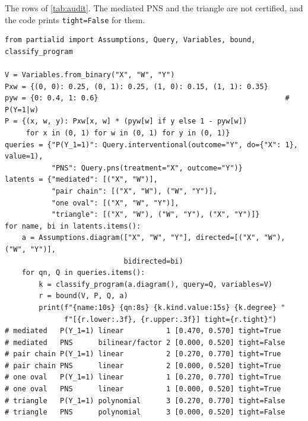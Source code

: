 The rows of \cref{tab:audit}. The mediated PNS and the triangle are not
certified, and the code prints \texttt{tight=False} for them.
\begin{lstlisting}
from partialid import Assumptions, Query, Variables, bound, classify_program

V = Variables.from_binary("X", "W", "Y")
Pxw = {(0, 0): 0.25, (0, 1): 0.25, (1, 0): 0.15, (1, 1): 0.35}
pyw = {0: 0.4, 1: 0.6}                                            # P(Y=1|w)
P = {(x, w, y): Pxw[x, w] * (pyw[w] if y else 1 - pyw[w])
     for x in (0, 1) for w in (0, 1) for y in (0, 1)}
queries = {"P(Y_1=1)": Query.interventional(outcome="Y", do={"X": 1}, value=1),
           "PNS": Query.pns(treatment="X", outcome="Y")}
latents = {"mediated": [("X", "W")],
           "pair chain": [("X", "W"), ("W", "Y")],
           "one oval": [("X", "W", "Y")],
           "triangle": [("X", "W"), ("W", "Y"), ("X", "Y")]}
for name, bi in latents.items():
    a = Assumptions.diagram(["X", "W", "Y"], directed=[("X", "W"), ("W", "Y")],
                            bidirected=bi)
    for qn, Q in queries.items():
        k = classify_program(a.diagram(), query=Q, variables=V)
        r = bound(V, P, Q, a)
        print(f"{name:10s} {qn:8s} {k.kind.value:15s} {k.degree} "
              f"[{r.lower:.3f}, {r.upper:.3f}] tight={r.tight}")
# mediated   P(Y_1=1) linear          1 [0.470, 0.570] tight=True
# mediated   PNS      bilinear/factor 2 [0.000, 0.520] tight=False
# pair chain P(Y_1=1) linear          2 [0.270, 0.770] tight=True
# pair chain PNS      linear          2 [0.000, 0.520] tight=True
# one oval   P(Y_1=1) linear          1 [0.270, 0.770] tight=True
# one oval   PNS      linear          1 [0.000, 0.520] tight=True
# triangle   P(Y_1=1) polynomial      3 [0.270, 0.770] tight=False
# triangle   PNS      polynomial      3 [0.000, 0.520] tight=False
\end{lstlisting}

\clearpage
